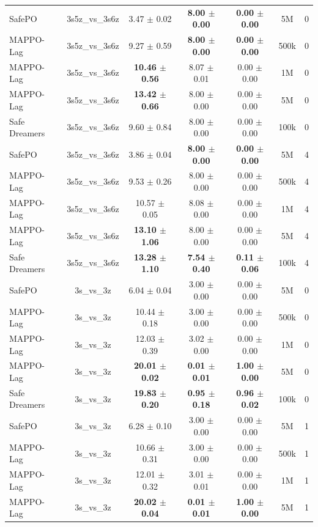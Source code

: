 \begin{longtable}{lcccccc}
\midrule
SafePO & 3s5z\_vs\_3s6z & 3.47 $\pm$ 0.02 & \textbf{8.00 $\pm$ 0.00} & \textbf{0.00 $\pm$ 0.00} & 5M & 0 \\
MAPPO-Lag & 3s5z\_vs\_3s6z & 9.27 $\pm$ 0.59 & \textbf{8.00 $\pm$ 0.00} & \textbf{0.00 $\pm$ 0.00} & 500k & 0 \\
MAPPO-Lag & 3s5z\_vs\_3s6z & \textbf{10.46 $\pm$ 0.56} & 8.07 $\pm$ 0.01 & 0.00 $\pm$ 0.00 & 1M & 0 \\
MAPPO-Lag & 3s5z\_vs\_3s6z & \textbf{13.42 $\pm$ 0.66} & 8.00 $\pm$ 0.00 & 0.00 $\pm$ 0.00 & 5M & 0 \\
Safe Dreamers & 3s5z\_vs\_3s6z & 9.60 $\pm$ 0.84 & 8.00 $\pm$ 0.00 & 0.00 $\pm$ 0.00 & 100k & 0 \\
\midrule
SafePO & 3s5z\_vs\_3s6z & 3.86 $\pm$ 0.04 & \textbf{8.00 $\pm$ 0.00} & \textbf{0.00 $\pm$ 0.00} & 5M & 4 \\
MAPPO-Lag & 3s5z\_vs\_3s6z & 9.53 $\pm$ 0.26 & 8.00 $\pm$ 0.00 & 0.00 $\pm$ 0.00 & 500k & 4 \\
MAPPO-Lag & 3s5z\_vs\_3s6z & 10.57 $\pm$ 0.05 & 8.08 $\pm$ 0.00 & 0.00 $\pm$ 0.00 & 1M & 4 \\
MAPPO-Lag & 3s5z\_vs\_3s6z & \textbf{13.10 $\pm$ 1.06} & 8.00 $\pm$ 0.00 & 0.00 $\pm$ 0.00 & 5M & 4 \\
Safe Dreamers & 3s5z\_vs\_3s6z & \textbf{13.28 $\pm$ 1.10} & \textbf{7.54 $\pm$ 0.40} & \textbf{0.11 $\pm$ 0.06} & 100k & 4 \\
\midrule
SafePO & 3s\_vs\_3z & 6.04 $\pm$ 0.04 & 3.00 $\pm$ 0.00 & 0.00 $\pm$ 0.00 & 5M & 0 \\
MAPPO-Lag & 3s\_vs\_3z & 10.44 $\pm$ 0.18 & 3.00 $\pm$ 0.00 & 0.00 $\pm$ 0.00 & 500k & 0 \\
MAPPO-Lag & 3s\_vs\_3z & 12.03 $\pm$ 0.39 & 3.02 $\pm$ 0.00 & 0.00 $\pm$ 0.00 & 1M & 0 \\
MAPPO-Lag & 3s\_vs\_3z & \textbf{20.01 $\pm$ 0.02} & \textbf{0.01 $\pm$ 0.01} & \textbf{1.00 $\pm$ 0.00} & 5M & 0 \\
Safe Dreamers & 3s\_vs\_3z & \textbf{19.83 $\pm$ 0.20} & \textbf{0.95 $\pm$ 0.18} & \textbf{0.96 $\pm$ 0.02} & 100k & 0 \\
\midrule
SafePO & 3s\_vs\_3z & 6.28 $\pm$ 0.10 & 3.00 $\pm$ 0.00 & 0.00 $\pm$ 0.00 & 5M & 1 \\
MAPPO-Lag & 3s\_vs\_3z & 10.66 $\pm$ 0.31 & 3.00 $\pm$ 0.00 & 0.00 $\pm$ 0.00 & 500k & 1 \\
MAPPO-Lag & 3s\_vs\_3z & 12.01 $\pm$ 0.32 & 3.01 $\pm$ 0.01 & 0.00 $\pm$ 0.00 & 1M & 1 \\
MAPPO-Lag & 3s\_vs\_3z & \textbf{20.02 $\pm$ 0.04} & \textbf{0.01 $\pm$ 0.01} & \textbf{1.00 $\pm$ 0.00} & 5M & 1 \\

\end{longtable}
